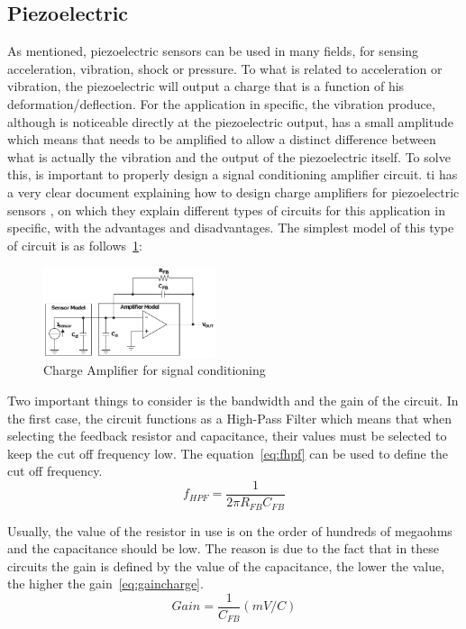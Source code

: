 \subsection{Piezoelectric}
As mentioned, piezoelectric sensors can be used in many fields, for sensing acceleration, vibration, shock or pressure. To what is related to acceleration or vibration, the piezoelectric will output a charge that is a function of his deformation/deflection. For the application in specific, the vibration produce, although is noticeable directly at the piezoelectric output, has a small amplitude which means that needs to be amplified to allow a distinct difference between what is actually the vibration and the output of the piezoelectric itself. To solve this, is important to properly design a signal conditioning amplifier circuit. \acrlong{ti} has a very clear document explaining how to design charge amplifiers for piezoelectric sensors \cite{bartolomeSignalConditioningPiezoelectric2010}, on which they explain different types of circuits for this application in specific, with the advantages and disadvantages. The simplest model of this type of circuit is as follows~\ref{fig:ChargeAmpSimp}: 
\begin{figure}[]
    \centering
    \includegraphics[width=0.45\textwidth]{Chapters/4CHP/Figures/singleenddedchargeamp.pdf}
    \caption{Charge Amplifier for signal conditioning}
    \label{fig:ChargeAmpSimp}
\end{figure}

Two important things to consider is the bandwidth and the gain of the circuit. In the first case, the circuit functions as a High-Pass Filter which means that when selecting the feedback resistor and capacitance, their values must be selected to keep the cut off frequency low. The equation~\ref{eq:fhpf} can be used to define the cut off frequency.
\begin{equation}\label{eq:fhpf}
    f_{HPF} = \frac{1}{2\pi R_{FB}C_{FB}}
\end{equation}

Usually, the value of the resistor in use is on the order of hundreds of megaohms and the capacitance should be low. The reason is due to the fact that in these circuits the gain is defined by the value of the capacitance, the lower the value, the higher the gain~\ref{eq:gaincharge}.
\begin{equation}\label{eq:gaincharge}
    Gain = \frac{1}{C_{FB}} (mV/C)
\end{equation}

